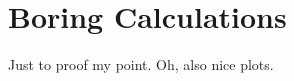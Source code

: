 
\chapter{Boring Calculations} \label{ch:Calcs}

Just to proof my point. Oh, also nice plots. \cite{alderliesten2011}